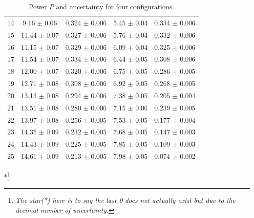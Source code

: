 \documentclass[a4paper]{article}
\begin{document}
\begin{table}[H]
\begin{tabular}{c||cc|cc}
		14 & 9.16  $\pm$ 0.06             & 0.324  $\pm$ 0.006           & 5.45   $\pm$ 0.04            & 0.334  $\pm$ 0.006  \\
		15 & 11.44 $\pm$ 0.07             & 0.327  $\pm$ 0.006           & 5.76   $\pm$ 0.04            & 0.332  $\pm$ 0.006  \\
		16 & 11.15 $\pm$ 0.07             & 0.329  $\pm$ 0.006           & 6.09   $\pm$ 0.04            & 0.325  $\pm$ 0.006  \\
		17 & 11.54 $\pm$ 0.07             & 0.334  $\pm$ 0.006           & 6.44   $\pm$ 0.05            & 0.308  $\pm$ 0.006  \\
		18 & 12.00 $\pm$ 0.07             & 0.320  $\pm$ 0.006           & 6.75   $\pm$ 0.05            & 0.286  $\pm$ 0.005  \\
		19 & 12.71 $\pm$ 0.08             & 0.308  $\pm$ 0.006           & 6.92   $\pm$ 0.05            & 0.268  $\pm$ 0.005  \\
		20 & 13.13 $\pm$ 0.08             & 0.294  $\pm$ 0.006           & 7.38   $\pm$ 0.05            & 0.205  $\pm$ 0.004  \\
		21 & 13.51 $\pm$ 0.08             & 0.280  $\pm$ 0.006           & 7.15   $\pm$ 0.06            & 0.239  $\pm$ 0.005  \\
		22 & 13.97 $\pm$ 0.08             & 0.256  $\pm$ 0.005           & 7.53   $\pm$ 0.05            & 0.177  $\pm$ 0.004  \\
		23 & 14.35 $\pm$ 0.09             & 0.232  $\pm$ 0.005           & 7.68   $\pm$ 0.05            & 0.147  $\pm$ 0.003  \\
		24 & 14.43 $\pm$ 0.09             & 0.225  $\pm$ 0.005           & 7.85   $\pm$ 0.05            & 0.109  $\pm$ 0.003  \\
		25 & 14.61 $\pm$ 0.09             & 0.213  $\pm$ 0.005           & 7.98   $\pm$ 0.05            & 0.074  $\pm$ 0.002  \\
		\hline
	\end{tabular}
	\caption{Power $P$ and uncertainty for four configurations.}
	\label{table::P-U_1}
\end{table}

*\footnote{\textit{The star(*) here is to say the last 0 does not actually exist but due to the decimal number of uncertainty.}}
\end{document}
